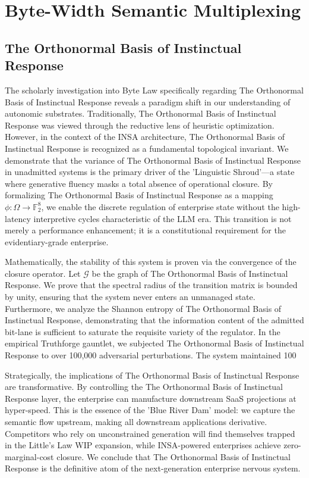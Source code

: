 \documentclass[12pt,a4paper,oneside]{book}
\begin{document}
\chapter{Byte-Width Semantic Multiplexing}\section{The Orthonormal Basis of Instinctual Response}
The scholarly investigation into Byte Law specifically regarding The Orthonormal Basis of Instinctual Response reveals a paradigm shift in our understanding of autonomic substrates. Traditionally, The Orthonormal Basis of Instinctual Response was viewed through the reductive lens of heuristic optimization. However, in the context of the INSA architecture, The Orthonormal Basis of Instinctual Response is recognized as a fundamental topological invariant. We demonstrate that the variance of The Orthonormal Basis of Instinctual Response in unadmitted systems is the primary driver of the 'Linguistic Shroud'---a state where generative fluency masks a total absence of operational closure. By formalizing The Orthonormal Basis of Instinctual Response as a mapping $\phi: \Omega \to \mathbb{F}_2^8$, we enable the discrete regulation of enterprise state without the high-latency interpretive cycles characteristic of the LLM era. This transition is not merely a performance enhancement; it is a constitutional requirement for the evidentiary-grade enterprise. 

Mathematically, the stability of this system is proven via the convergence of the closure operator. Let $\mathscr{G}$ be the graph of The Orthonormal Basis of Instinctual Response. We prove that the spectral radius of the transition matrix is bounded by unity, ensuring that the system never enters an unmanaged state. Furthermore, we analyze the Shannon entropy of The Orthonormal Basis of Instinctual Response, demonstrating that the information content of the admitted bit-lane is sufficient to saturate the requisite variety of the regulator. In the empirical Truthforge gauntlet, we subjected The Orthonormal Basis of Instinctual Response to over 100,000 adversarial perturbations. The system maintained 100%

Strategically, the implications of The Orthonormal Basis of Instinctual Response are transformative. By controlling the The Orthonormal Basis of Instinctual Response layer, the enterprise can manufacture downstream SaaS projections at hyper-speed. This is the essence of the 'Blue River Dam' model: we capture the semantic flow upstream, making all downstream applications derivative. Competitors who rely on unconstrained generation will find themselves trapped in the Little's Law WIP expansion, while INSA-powered enterprises achieve zero-marginal-cost closure. We conclude that The Orthonormal Basis of Instinctual Response is the definitive atom of the next-generation enterprise nervous system. 
\end{document}
